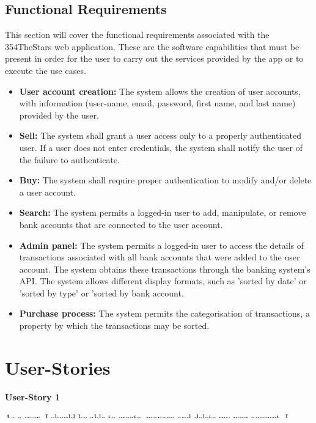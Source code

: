 \documentclass[11pt]{article}
\newcounter{use case ID}
\newcounter{req ID}
\begin{document}
\subsection{Functional Requirements} \label{func req}

This section will cover the functional requirements associated with the 354TheStars web application. These are the software capabilities that must be present in order for the user to carry out the services provided by the app or to execute the use cases.

\begin{itemize}
    \item  \textbf{User account creation:} The system allows the creation of user accounts, with information (user-name, email, password, first name, and last name) provided by the user.
    \item \textbf{Sell:} The system shall grant a user access only to a properly authenticated user. If a user does not enter credentials, the system shall notify the user of the failure to authenticate.
    \item \textbf{Buy:} The system shall require proper authentication to modify and/or delete a user account.
    \item  \textbf{Search:} The system permits a logged-in user to add, manipulate, or remove bank accounts that are connected to the user account.
    \item  \textbf{Admin panel:} The system permits a logged-in user to access the details of transactions associated with all bank accounts that were added to the user account. The system obtains these transactions through the banking system's API. The system allows different display formats, such as 'sorted by date' or 'sorted by type' or 'sorted by bank account.
    \item \textbf{Purchase process:} The system permits the categorisation of transactions, a property by which the transactions may be sorted.
\end{itemize}

\section{User-Stories}

\textbf{User-Story 1}

As a user, I should be able to create, manage and delete my user account. I should have the options to view and update personal information to facilitate more efficient use of the application and personalise my experience.
\end{document}
